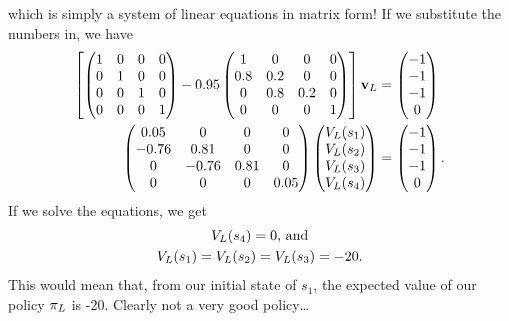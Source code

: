 \documentclass[a4paper]{article}
\begin{document}
which is simply a system of linear equations in matrix form!
If we substitute the numbers in, we have
\begin{align*}
  \left[
    \begin{pmatrix}
      1 & 0 & 0 & 0 \\
      0 & 1 & 0 & 0 \\
      0 & 0 & 1 & 0 \\
      0 & 0 & 0 & 1 \\
    \end{pmatrix}
    - 0.95
    \begin{pmatrix}
      1   & 0   & 0   & 0 \\
      0.8 & 0.2 & 0   & 0 \\
      0   & 0.8 & 0.2 & 0 \\
      0   & 0   & 0   & 1 \\
    \end{pmatrix}
  \right]
  \mathbf{v}_L &=
  \begin{pmatrix}
    -1 \\ -1 \\ -1 \\ 0 \\
  \end{pmatrix} \\
  \begin{pmatrix}
    0.05  & 0     & 0    & 0    \\
    -0.76 & 0.81  & 0    & 0    \\
    0     & -0.76 & 0.81 & 0    \\
    0     & 0     & 0    & 0.05 \\
  \end{pmatrix}
  \begin{pmatrix}
    V_L(s_1) \\
    V_L(s_2) \\
    V_L(s_3) \\
    V_L(s_4)
  \end{pmatrix}
  &=
  \begin{pmatrix}
    -1 \\ -1 \\ -1 \\ 0 \\
  \end{pmatrix} .
\end{align*}
If we solve the equations, we get
\begin{gather*}
  V_L(s_4) = 0 \text{, and} \\
  V_L(s_1) = V_L(s_2) = V_L(s_3) = -20 .
\end{gather*}
This would mean that, from our initial state of $s_1$,
the expected value of our policy $\pi_L$ is -20.
Clearly not a very good policy\dots
\end{document}
